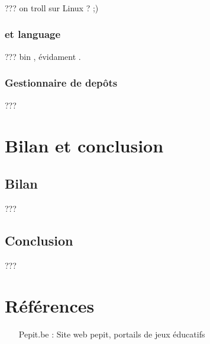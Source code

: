 \documentclass[french]{report}
\begin{document}
\subsection{\os}
??? on troll sur Linux ? ;) \linux{}
\subsection{\ide{} et language}
??? bin \java{}, évidament \eclipse{}.
\subsection{Gestionnaire de depôts}
??? \github




\chapter*{Bilan et conclusion}
\section*{Bilan}
???
\section*{Conclusion}
???

\appendix %
\chapter{Références}

\begin{itemize}
\item[Pepit.be :] Site web pepit, portails de jeux éducatifs
\end{itemize}
\end{document}
